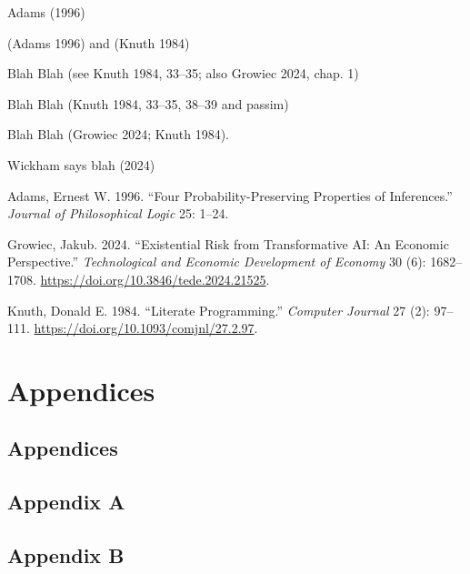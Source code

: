 \documentclass[
  letterpaper,
]{book}
\newlength{\cslhangindent}
\newenvironment{CSLReferences}[2] %
 {\begin{list}{}{%
  \setlength{\itemindent}{0pt}
  \setlength{\leftmargin}{0pt}
  \setlength{\parsep}{0pt}
  \ifodd #1
   \setlength{\leftmargin}{\cslhangindent}
   \setlength{\itemindent}{-1\cslhangindent}
  \fi
  \setlength{\itemsep}{#2\baselineskip}}}
 {\end{list}}
\begin{document}

Adams (1996)

(Adams 1996) and (Knuth 1984)

Blah Blah (see Knuth 1984, 33--35; also Growiec 2024, chap. 1)

Blah Blah (Knuth 1984, 33--35, 38--39 and passim)

Blah Blah (Growiec 2024; Knuth 1984).

Wickham says blah (2024)

\label{refs}
\begin{CSLReferences}{1}{0}
Adams, Ernest W. 1996. {``Four Probability-Preserving Properties of
Inferences.''} \emph{Journal of Philosophical Logic} 25: 1--24.

Growiec, Jakub. 2024. {``Existential Risk from Transformative {AI}: An
Economic Perspective.''} \emph{Technological and Economic Development of
Economy} 30 (6): 1682--1708.
\url{https://doi.org/10.3846/tede.2024.21525}.

Knuth, Donald E. 1984. {``Literate Programming.''} \emph{Computer
Journal} 27 (2): 97--111. \url{https://doi.org/10.1093/comjnl/27.2.97}.

\end{CSLReferences}

\cleardoublepage
{}
{}
\appendix

\chapter{Appendices}\label{appendices-1}

\section{Appendices}\label{appendices-2}

\section{Appendix A}\label{appendix-a}

\section{Appendix B}\label{appendix-b}
\end{document}
